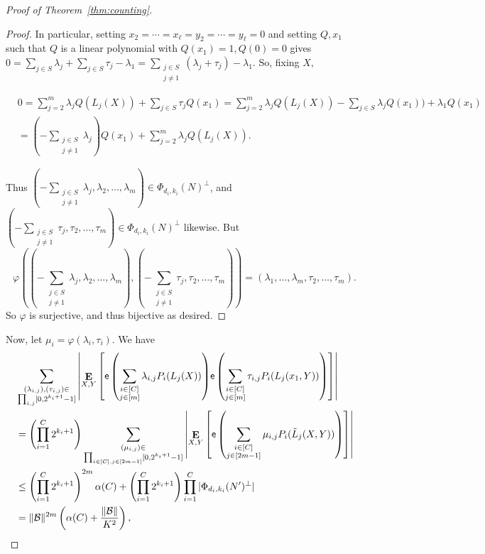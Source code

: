 \documentclass{article}
\theoremstyle{plain}
\theoremstyle{definition}
\theoremstyle{definition}
\theoremstyle{remark}
\numberwithin{equation}{section}
\newcommand{\Esymb}{{\bf E}}
\DeclareMathOperator*{\E}{\Esymb}
\newcommand{\cB}{\mathcal B}
\newcommand{\expo}[1]{{\mathsf{e}\left(#1\right)}}
\begin{document}
\begin{proof}[Proof of Theorem~\ref{thm:counting}]
\begin{proof}
In particular, setting $x_2=\cdots=x_\ell=y_2=\cdots=y_\ell=0$ and setting $Q,x_1$ such that $Q$ is a linear polynomial with $Q(x_1)=1,Q(0)=0$ gives $0 = \sum_{j\in S} \lambda_j + \sum_{j\in S} \tau_j - \lambda_1 = \sum_{\substack{j\in S \\ j\neq 1}} (\lambda_j+\tau_j) - \lambda_1$. So, fixing $X$,

\begin{align*}
& 0=\sum_{j=2}^m \lambda_j Q(L_j(X))+\sum_{j\in S} \tau_j Q(x_1) = \sum_{j=2}^m \lambda_j Q(L_j(X)) - \sum_{j\in S} \lambda_j Q(x_1)) + \lambda_1 Q(x_1) \\
& = \left( - \sum_{\substack{j\in S\\ j\neq 1}} \lambda_j\right) Q(x_1)  + \sum_{j=2}^m \lambda_j Q(L_j(X)).
\end{align*}

Thus $\left(- \sum_{\substack{j\in S\\ j\neq 1}} \lambda_j,\lambda_2,\dots,\lambda_m\right)\in \Phi_{d_i,k_i}(N)^\perp$, and $\left(- \sum_{\substack{j\in S\\ j\neq 1}} \tau_j,\tau_2,\dots,\tau_m\right)\in \Phi_{d_i,k_i}(N)^\perp$ likewise. But
\[
    \varphi\left(\left(- \sum_{\substack{j\in S\\ j\neq 1}} \lambda_j,\lambda_2,\dots,\lambda_m\right),\left(- \sum_{\substack{j\in S\\ j\neq 1}} \tau_j,\tau_2,\dots,\tau_m\right)\right)=(\lambda_1,\dots,\lambda_m,\tau_2,\dots,\tau_m).
\]
So $\varphi$ is surjective, and thus bijective as desired.

\end{proof}

Now, let $\mu_i = \varphi(\lambda_i,\tau_i)$. We have
\begin{align*}
    & \sum_{\substack{(\lambda_{i,j}),(\tau_{i,j})\in\\ \prod_{i,j}[0,2^{k_i+1}-1]}}\left |\E_{\substack{X,Y}}\left[\expo{\sum_{\substack{i\in[C]\\ j\in[m]}} \lambda_{i,j}P_i(L_j(X))}\expo{\sum_{\substack{i\in[C]\\ j\in[m]}} \tau_{i,j}P_i(L_j(x_1,Y))}\right]\right|\\
    & = \left(\prod_{i=1}^C 2^{k_i+1} \right)\sum_{\substack{(\mu_{i,j})\in\\ \prod_{i\in [C], j\in [2m-1]}[0,2^{k_i+1}-1]}}\left |\E_{X,Y}\left[\expo{\sum_{\substack{i\in[C]\\ j\in[2m-1]}} \mu_{i,j}P_i(\tilde{L}_j(X,Y))}\right]\right|\\
    & \leq \left(\prod_{i=1}^C 2^{k_i+1}\right)^{2m} \alpha(C) + \left(\prod_{i=1}^C 2^{k_i+1}\right)\prod_{i=1}^C |\Phi_{d_i,k_i}(N')^\perp| \\
    & = \|\cB\|^{2m}\left(\alpha(C)+\frac{\|\cB\|}{K^2}\right),
\end{align*}


\end{proof}
\end{document}
